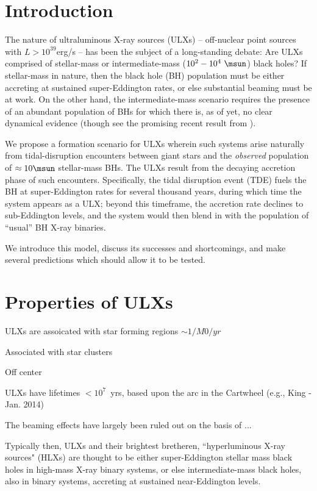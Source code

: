 \section{Introduction}\label{section:Intro}


The nature of ultraluminous X-ray sources (ULXs) -- off-nuclear point
sources with $L>10^{39}$erg/s -- has been the subject of a
long-standing debate: Are ULXs comprised of stellar-mass or
intermediate-mass ($10^{2}-10^4~\msun$) black holes?  If stellar-mass in nature, then
the black hole (BH) population must be either accreting at sustained super-Eddington
rates, or else substantial beaming must be at work.  
On the other hand, the intermediate-mass scenario requires the presence of an
abundant population of BHs for which there is, as of yet, no clear
dynamical evidence (though see the promising recent result from
\citealt{Pasham_2014}).

We propose a formation scenario for ULXs wherein
such systems arise naturally from tidal-disruption encounters between
giant stars and the {\em observed} population of $\approx 10\msun$ stellar-mass BHs.  
The ULXs result from the decaying
accretion phase of such encounters.  Specifically, the tidal
disruption event (TDE) fuels the BH at super-Eddington rates for
several thousand years, during which time the system appears as a ULX;
beyond this timeframe, the accretion rate declines to sub-Eddington
levels, and the system would then blend in with the population of
``usual'' BH X-ray binaries.

We introduce this model, discuss its successes and shortcomings, and make several predictions which should allow it to be tested.  

\section{Properties of ULXs}

ULXs are assoicated with star forming regions
$\sim 1 / M0/yr$

Associated with star clusters

Off center

ULXs have lifetimes $<10^7$~yrs, based upon the arc in the Cartwheel (e.g., King - Jan. 2014)

The beaming effects have largely been ruled out on the basis of ...

Typically then, ULXs and their brightest bretheren, ``hyperluminous X-ray sources" (HLXs) are thought to be either super-Eddington stellar mass black holes in high-mass X-ray binary systems, or else intermediate-mass black holes, also in binary systems, accreting at sustained near-Eddington levels.    

